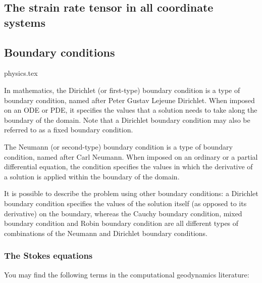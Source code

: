 \subsection{The strain rate tensor in all coordinate systems}



\newpage
\subsection{Boundary conditions}
\begin{flushright} {\tiny {\color{gray} physics.tex}} \end{flushright}

In mathematics, the Dirichlet (or first-type) 
boundary condition is a type of boundary condition, named after Peter Gustav Lejeune Dirichlet.
When imposed on an ODE or PDE, it specifies the values that a solution needs 
to take along the boundary of the domain.
Note that a Dirichlet boundary condition may also be referred to as a fixed boundary condition. 

The Neumann (or second-type) boundary condition is a type of boundary condition, 
named after Carl Neumann. When imposed on an ordinary or a partial differential equation, 
the condition specifies the values in which the derivative of a solution is 
applied within the boundary of the domain.

It is possible to describe the problem using other boundary conditions: 
a Dirichlet boundary condition specifies the values of the solution itself 
(as opposed to its derivative) on the boundary, whereas the Cauchy boundary condition, 
mixed boundary condition and Robin boundary condition are all different types of combinations 
of the Neumann and Dirichlet boundary conditions.


\subsubsection{The Stokes equations}

You may find the following terms in the computational geodynamics literature:

